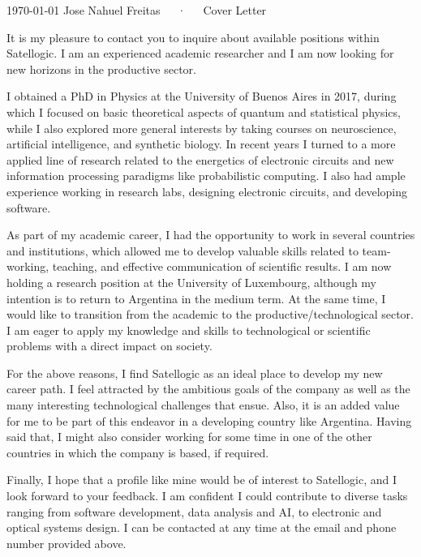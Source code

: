 \documentclass[11pt, a4paper]{awesome-cv}
\begin{document}
\makecvheader[R]

\makecvfooter
  {\today}
  {Jose Nahuel Freitas~~~·~~~Cover Letter}
  {}

\makelettertitle

\begin{cvletter}
  It is my pleasure to contact you to inquire about available positions within
  Satellogic. I am an experienced academic researcher and I am now looking for new
  horizons in the productive sector.

  I obtained a PhD in Physics at the University of Buenos Aires in 2017, during which I focused on basic theoretical
  aspects of quantum and statistical physics, while I also explored more general
  interests by taking courses on neuroscience, artificial intelligence, and synthetic
  biology. In recent years I turned to a more applied line of research related to
  the energetics of electronic circuits and new information processing paradigms
  like probabilistic computing. I also had ample experience working in research
  labs, designing electronic circuits, and developing software.

  As part of my academic career, I had the opportunity to work in several countries
  and institutions, which allowed me to develop valuable skills related to team-working,
  teaching, and effective communication of scientific results. I am now holding a
  research position at the University of Luxembourg, although my intention is to return
  to Argentina in the medium term. At the same time, I would like to
  transition from the academic to the productive/technological sector. I am
  eager to apply my knowledge and skills to technological or scientific problems
  with a direct impact on society.

  For the above reasons, I find Satellogic as an ideal place to develop my new career
  path. I feel attracted by the ambitious goals of the company as well as the many
  interesting technological challenges that ensue. Also, it is an added value
  for me to be part of this endeavor in a developing country like Argentina. Having
  said that, I might also consider working for some time in one of the other countries in which the company is based, if required.

  Finally, I hope that a profile like mine would be of interest to Satellogic,
  and I look forward to your feedback.
  I am confident I could contribute to diverse tasks ranging from software development,
  data analysis and AI, to electronic and optical systems design.
  I can be contacted at any time at the email and phone number provided above.


\end{cvletter}


\makeletterclosing
\end{document}
